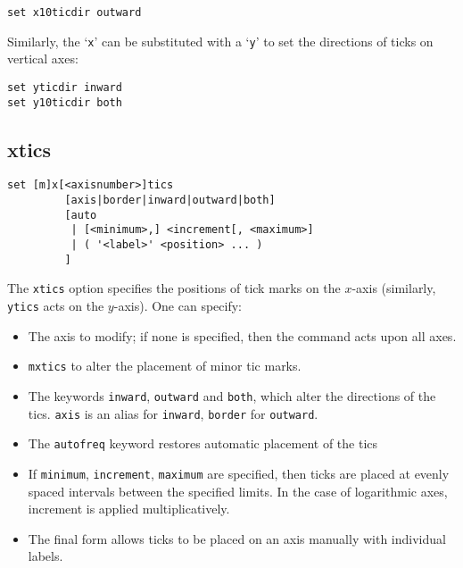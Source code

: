 \documentclass[a4paper,onecolumn,11pt]{book}
\begin{document}
\begin{verbatim}
set x10ticdir outward
\end{verbatim}

Similarly, the `{\tt x}' can be substituted with a `{\tt y}' to set the directions of ticks
on vertical axes:

\begin{verbatim}
set yticdir inward
set y10ticdir both
\end{verbatim}

\subsection{xtics}

\begin{verbatim}
set [m]x[<axisnumber>]tics 
         [axis|border|inward|outward|both] 
         [auto 
          | [<minimum>,] <increment[, <maximum>] 
          | ( '<label>' <position> ... ) 
         ] 
\end{verbatim}

The {\tt xtics} option specifies the positions of tick marks on the $x$-axis
(similarly, {\tt ytics} acts on the $y$-axis).  One can specify:

\begin{itemize}
\item The axis to modify; if none is specified, then the command acts upon all axes.

\item {\tt mxtics} to alter the placement of minor tic marks.

\item The keywords {\tt inward}, {\tt outward} and {\tt both}, which alter the
directions of the tics.  {\tt axis} is an alias for {\tt inward}, {\tt border}
for {\tt outward}.

\item The {\tt autofreq} keyword restores automatic placement of the tics

\item If {\tt minimum}, {\tt increment}, {\tt maximum} are specified, then ticks
are placed at evenly spaced intervals between the specified limits. In the case
of logarithmic axes, increment is applied multiplicatively. 

\item The final form allows ticks to be placed on an axis manually with
individual labels.
\end{itemize}
   
\end{document}
